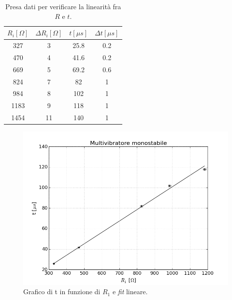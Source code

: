 \documentclass[10pt,a4paper]{article}
\begin{document}
\begin{table}[!htb]
\centering
\begin{tabular}{|c|c|c|c|}
\hline 
$R_i [\Omega ]$ & $\Delta R_i [\Omega ]$ & $t [\mu s]$ & $\Delta t [\mu s]$\\
\hline
 327 &  3 & 25.8 & 0.2\\ 
\hline 
 470 &  4 & 41.6 & 0.2\\ 
\hline
 669 &  5 & 69.2 & 0.6\\ 
\hline
 824 &  7 & 82 & 1\\ 
\hline 
 984 &  8 & 102 & 1\\ 
\hline
 1183 &  9 & 118 & 1\\ 
\hline
 1454 &  11 & 140 & 1\\ 
\hline
\end{tabular} 
\caption{Presa dati per verificare la linearità fra $R$ e $t$.\label{tab:monostabile}}
\end{table}

\begin{figure}[!htb]
  \centering
  \includegraphics[scale=0.5]{fitmonostabile.png}
\caption{Grafico di t in funzione di $R_1$ e \emph{fit} lineare.\label{fit:monostabile}}
\end{figure}
\end{document}

